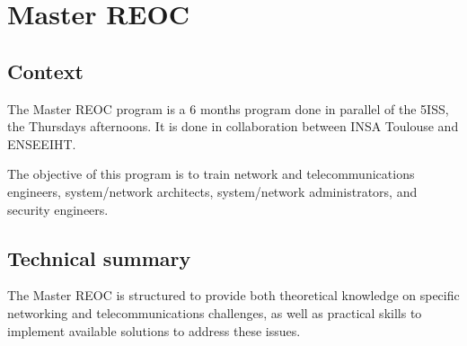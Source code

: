 \section{Master REOC}

\subsection{Context}
\indent \indent The Master REOC program is a 6 months program done in parallel of the 5ISS, the Thursdays afternoons. It is done in collaboration between INSA Toulouse and ENSEEIHT.

The objective of this program is to train network and telecommunications engineers, system/network architects, system/network administrators, and security engineers.

\subsection{Technical summary}

\indent \indent The Master REOC is structured to provide both theoretical knowledge on specific networking and telecommunications challenges, as well as practical skills to implement available solutions to address these issues.

